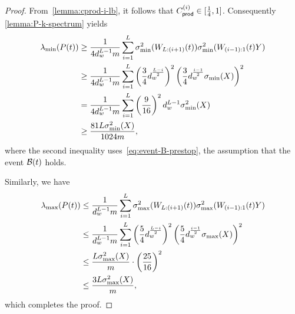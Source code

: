 \begin{proof}
  From~\cref{lemma:cprod-i-lb}, it follows that $C_{\mathsf{prod}}^{({i})} \in [\frac{1}{4}, 1]$. Consequently \cref{lemma:P-k-spectrum} yields
  \begin{align*}
    \lambda_{\min}(P(t)) &\geq \frac{1}{4 d_{w}^{L-1} m} \sum_{i = 1}^L \sigma_{\min}^2(W_{L:(i+1)}(t)) \sigma_{\min}^2(W_{(i-1):1}(t)Y) \\
                         &\geq
                         \frac{1}{4 d_w^{L-1} m} \sum_{i = 1}^L \left(\frac{3}{4} d_{w}^{\frac{L - i}{2}}\right)^2 \left(\frac{3}{4} d_{w}^{\frac{i-1}{2}} \sigma_{\min}(X) \right)^2 \\
                         &= \frac{1}{4 d_{w}^{L-1} m} \sum_{i = 1}^L \left( \frac{9}{16} \right)^2 d_{w}^{L - 1} \sigma_{\min}^2(X) \\
                         &\geq \frac{81 L \sigma_{\min}^2(X)}{1024 m},
  \end{align*}
  where the second inequality uses~\cref{eq:event-B-prestop}, the assumption that the event $\mathcal{B}(t)$ holds.
 
  Similarly, we have
  \begin{align*}
    \lambda_{\max}(P(t)) &\leq
    \frac{1}{d_{w}^{L-1} m} \sum_{i = 1}^L \sigma_{\max}^2(W_{L:(i+1)}(t)) \sigma_{\max}^2(W_{(i-1):1}(t)Y) \\
                         &\leq
    \frac{1}{d_{w}^{L-1} m} \sum_{i = 1}^L
    \left(\frac{5}{4} d_w^{\frac{L - i}{2}}\right)^2
    \left(\frac{5}{4} d_w^{\frac{i-1}{2}} \sigma_{\max}(X) \right)^2 \\
                         &\leq
    \frac{L \sigma_{\max}^2(X)}{m} \cdot \left( \frac{25}{16} \right)^2 \\
                         &\leq
    \frac{3L \sigma_{\max}^2(X)}{m},
  \end{align*}
  which completes the proof.
\end{proof}



